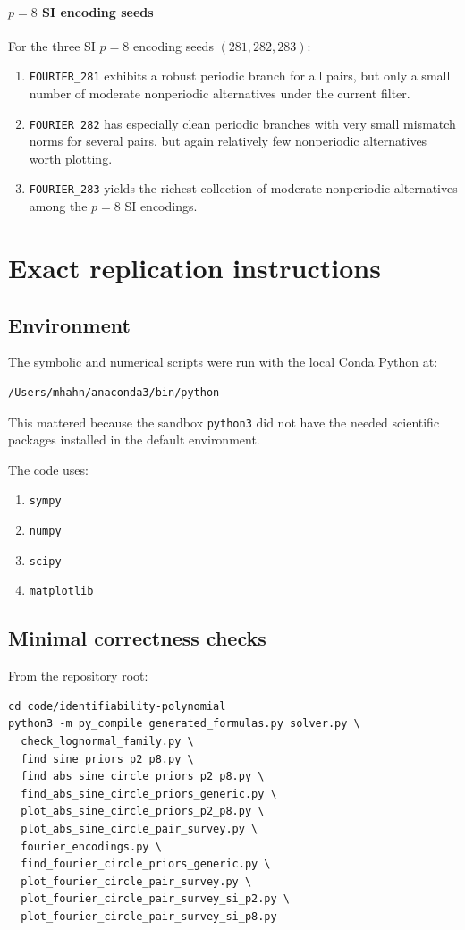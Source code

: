 \documentclass[11pt]{article}
\begin{document}
\paragraph*{$p=8$ SI encoding seeds}
For the three SI $p=8$ encoding seeds $(281,282,283)$:
\begin{enumerate}
\item \texttt{FOURIER\_281} exhibits a robust periodic branch for all pairs, but only a small number of moderate nonperiodic alternatives under the current filter.
\item \texttt{FOURIER\_282} has especially clean periodic branches with very small mismatch norms for several pairs, but again relatively few nonperiodic alternatives worth plotting.
\item \texttt{FOURIER\_283} yields the richest collection of moderate nonperiodic alternatives among the $p=8$ SI encodings.
\end{enumerate}

\section{Exact replication instructions}

\subsection{Environment}

The symbolic and numerical scripts were run with the local Conda Python at:
\begin{Verbatim}[fontsize=\small]
/Users/mhahn/anaconda3/bin/python
\end{Verbatim}

This mattered because the sandbox \texttt{python3} did not have the needed scientific packages installed in the default environment.

The code uses:
\begin{enumerate}
\item \texttt{sympy}
\item \texttt{numpy}
\item \texttt{scipy}
\item \texttt{matplotlib}
\end{enumerate}

\subsection{Minimal correctness checks}

From the repository root:
\begin{Verbatim}[fontsize=\small]
cd code/identifiability-polynomial
python3 -m py_compile generated_formulas.py solver.py \
  check_lognormal_family.py \
  find_sine_priors_p2_p8.py \
  find_abs_sine_circle_priors_p2_p8.py \
  find_abs_sine_circle_priors_generic.py \
  plot_abs_sine_circle_priors_p2_p8.py \
  plot_abs_sine_circle_pair_survey.py \
  fourier_encodings.py \
  find_fourier_circle_priors_generic.py \
  plot_fourier_circle_pair_survey.py \
  plot_fourier_circle_pair_survey_si_p2.py \
  plot_fourier_circle_pair_survey_si_p8.py
\end{Verbatim}
\end{document}
